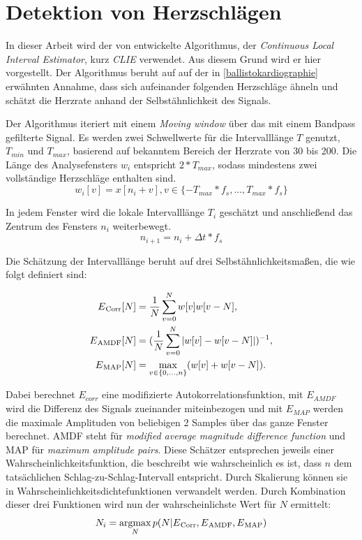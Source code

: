 \section{Detektion von Herzschlägen}\label{CLIE}

	In dieser Arbeit wird der von \citeauthor{Bruser2013} entwickelte Algorithmus, der \textit{Continuous Local Interval Estimator}, kurz \textit{CLIE} verwendet. Aus diesem Grund wird er hier vorgestellt. Der Algorithmus beruht auf auf der in \ref{ballistokardiographie} erwähnten Annahme, dass sich aufeinander folgenden Herzschläge ähneln und schätzt die Herzrate anhand der Selbstähnlichkeit des Signals.


	Der Algorithmus iteriert mit einem \textit{Moving window} über das mit einem Bandpass gefilterte Signal. Es werden zwei Schwellwerte für die Intervalllänge $T$ genutzt, $T_{min}$ und $T_{max}$, basierend auf bekanntem Bereich der Herzrate von 30 bis 200. Die Länge des Analysefensters $w_i$ entspricht $2 * T_{max}$, sodass mindestens zwei vollständige Herzschläge enthalten sind.
	\[w_i[v] = x[n_i + v], v \in \{ -T_{max} * f_s, ..., T_{max} * f_s\}\]
	
	In jedem Fenster wird die lokale Intervalllänge $T_i$ geschätzt und anschließend das Zentrum des Fensters $n_i$ weiterbewegt. \[ n_{i+1} = n_i + \Delta t * f_s \]
	
	Die Schätzung der Intervalllänge beruht auf drei Selbstähnlichkeitsmaßen, die wie folgt definiert sind:
	
	\begin{align*}
		E\textsubscript{Corr}[N] &= \frac{1}{N} \sum_{v=0}^{N} w[v]w[v-N],\\
		E\textsubscript{AMDF}[N] &= (\frac{1}{N} \sum_{v=0}^{N} |w[v]-w[v-N]|)^{-1},\\
		E\textsubscript{MAP}[N] &= \max_{v \in \{0,...,n\}}(w[v]+w[v-N]).
	\end{align*}
 	
 	Dabei berechnet $E_{corr}$ eine modifizierte Autokorrelationsfunktion, mit $E_{AMDF}$ wird die Differenz des Signals zueinander miteinbezogen und mit $E_{MAP}$ werden die maximale Amplituden von beliebigen 2 Samples über das ganze Fenster berechnet. AMDF steht für \textit{modified average magnitude difference function} und MAP für \textit{maximum amplitude pairs}. Diese Schätzer entsprechen jeweils einer Wahrscheinlichkeitsfunktion, die beschreibt wie wahrscheinlich es ist, dass $n$ dem tatsächlichen Schlag-zu-Schlag-Intervall entspricht. Durch Skalierung können sie in Wahrscheinlichkeitsdichtefunktionen verwandelt werden. Durch Kombination dieser drei Funktionen wird nun der wahrscheinlichste Wert für $N$ ermittelt:
 	\[ N_i = \operatorname*{argmax}_{N} p(N|E\textsubscript{Corr}, E\textsubscript{AMDF}, E\textsubscript{MAP}) \]
 	
